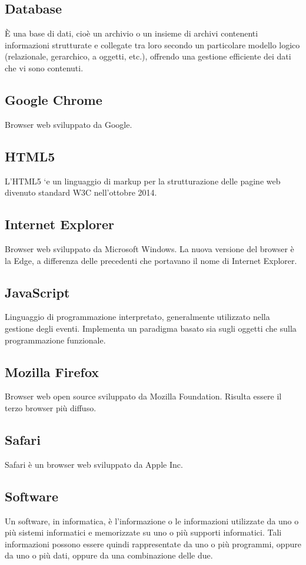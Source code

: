 \documentclass[a4paper, titlepage]{article}
\begin{document}
	 \subsection{Database}
	 È una base di dati, cioè un archivio o un insieme di archivi contenenti informazioni strutturate e
	 collegate tra loro secondo un particolare modello logico (relazionale, gerarchico, a oggetti, etc.),
	 offrendo una gestione efficiente dei dati che vi sono contenuti.

	 \subsection{Google Chrome}
	 Browser web sviluppato da Google.
	 
	 \subsection{HTML5}
	 L’HTML5 `e un linguaggio di markup per la strutturazione delle pagine web divenuto standard W3C nell’ottobre 2014.

	 \subsection{Internet Explorer}
	 Browser web sviluppato da Microsoft Windows. La nuova versione del browser è la Edge, a differenza delle precedenti che portavano il nome di Internet Explorer.

	 \subsection{JavaScript}
	 Linguaggio di programmazione interpretato, generalmente utilizzato nella gestione degli eventi.
	 Implementa un paradigma basato sia sugli oggetti che sulla programmazione funzionale.
	 
	 \subsection{Mozilla Firefox}
	 Browser web open source sviluppato da Mozilla Foundation. Risulta essere il terzo browser più diffuso.
	
	 \subsection{Safari}
 	 Safari è un browser web sviluppato da Apple Inc.
 	 
 	 \subsection{Software}
 	 Un software, in informatica, è l’informazione o le informazioni utilizzate da uno o più sistemi informatici
 	 e memorizzate su uno o più supporti informatici. Tali informazioni possono essere quindi rappresentate da uno o più programmi, oppure da uno o più dati, oppure da una combinazione
 	 delle due.
 	 
\end{document}
